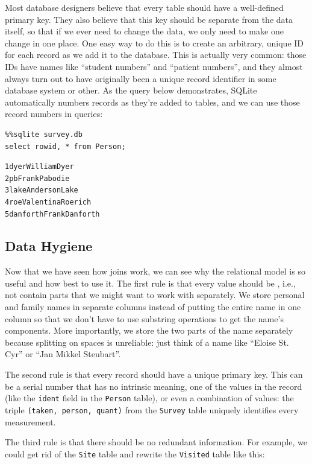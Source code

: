 \documentclass{book}
\begin{document}
Most database designers believe that every table should have a
well-defined primary key. They also believe that this key should be
separate from the data itself, so that if we ever need to change the
data, we only need to make one change in one place. One easy way to do
this is to create an arbitrary, unique ID for each record as we add it
to the database. This is actually very common: those IDs have names like
``student numbers'' and ``patient numbers'', and they almost always turn
out to have originally been a unique record identifier in some database
system or other. As the query below demonstrates, SQLite automatically
numbers records as they're added to tables, and we can use those record
numbers in queries:

\begin{verbatim}
%%sqlite survey.db
select rowid, * from Person;
\end{verbatim}

\begin{verbatim}
1dyerWilliamDyer
2pbFrankPabodie
3lakeAndersonLake
4roeValentinaRoerich
5danforthFrankDanforth
\end{verbatim}

\subsection{Data Hygiene}

Now that we have seen how joins work, we can see why the relational
model is so useful and how best to use it. The first rule is that every
value should be , i.e., not contain
parts that we might want to work with separately. We store personal and
family names in separate columns instead of putting the entire name in
one column so that we don't have to use substring operations to get the
name's components. More importantly, we store the two parts of the name
separately because splitting on spaces is unreliable: just think of a
name like ``Eloise St. Cyr'' or ``Jan Mikkel Steubart''.

The second rule is that every record should have a unique primary key.
This can be a serial number that has no intrinsic meaning, one of the
values in the record (like the \texttt{ident} field in the
\texttt{Person} table), or even a combination of values: the triple
\texttt{(taken, person, quant)} from the \texttt{Survey} table uniquely
identifies every measurement.

The third rule is that there should be no redundant information. For
example, we could get rid of the \texttt{Site} table and rewrite the
\texttt{Visited} table like this:
\end{document}

